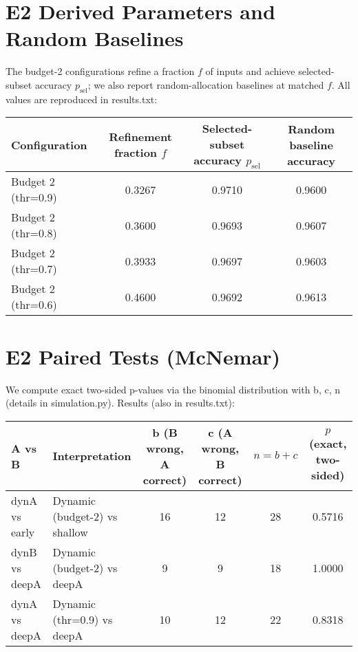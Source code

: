 \section{E2 Derived Parameters and Random Baselines}
\label{app:derived}
The budget-2 configurations refine a fraction $f$ of inputs and achieve selected-subset accuracy $p_{\mathrm{sel}}$; we also report random-allocation baselines at matched $f$. All values are reproduced in results.txt:
\begin{center}
\begin{adjustbox}{width=\linewidth}
\begin{tabular}{l c c c}
\toprule
Configuration & Refinement fraction $f$ & Selected-subset accuracy $p_{\mathrm{sel}}$ & Random baseline accuracy \\
\midrule
Budget 2 (thr=0.9) & 0.3267 & 0.9710 & 0.9600 \\
Budget 2 (thr=0.8) & 0.3600 & 0.9693 & 0.9607 \\
Budget 2 (thr=0.7) & 0.3933 & 0.9697 & 0.9603 \\
Budget 2 (thr=0.6) & 0.4600 & 0.9692 & 0.9613 \\
\bottomrule
\end{tabular}
\end{adjustbox}
\end{center}

\section{E2 Paired Tests (McNemar)}
We compute exact two-sided p-values via the binomial distribution with b, c, n (details in simulation.py). Results (also in results.txt):
\begin{center}
\begin{adjustbox}{width=\linewidth}
\begin{tabular}{l l c c c c}
\toprule
A vs B & Interpretation & b (B wrong, A correct) & c (A wrong, B correct) & $n=b+c$ & $p$ (exact, two-sided) \\
\midrule
dynA vs early & Dynamic (budget-2) vs shallow & 16 & 12 & 28 & 0.5716 \\
dynB vs deepA & Dynamic (budget-2) vs deepA    & 9  & 9  & 18 & 1.0000 \\
dynA vs deepA & Dynamic (thr=0.9) vs deepA     & 10 & 12 & 22 & 0.8318 \\
\bottomrule
\end{tabular}
\end{adjustbox}
\end{center}

